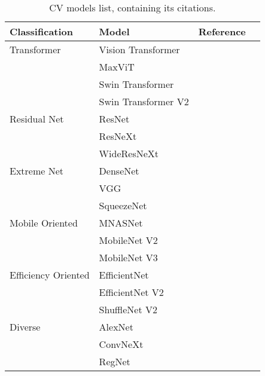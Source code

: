 
\begin{table}
	\centering
	\begin{tabular}{llcc}
		\toprule	
		Classification 		& Model 		& Reference 			\\
 		\midrule	
		Transformer    		& Vision Transformer	& \cite{VisionTransformer}	\\
			   		& MaxViT		& \cite{MaxViT}			\\
			   		& Swin Transformer	& \cite{SwinTransformer}	\\
			   		& Swin Transformer V2	& \cite{SwinTransformerV2}	\\
		Residual Net   		& ResNet		& \cite{ResNet}			\\
			 		& ResNeXt		& \cite{ResNeXt}		\\
			 		& WideResNeXt		& \cite{WideResNet}		\\
		Extreme Net	   	& DenseNet		& \cite{DenseNet}		\\
				 	& VGG			& \cite{VGG}			\\
					& SqueezeNet		& \cite{SqueezeNet}		\\
		Mobile Oriented		& MNASNet		& \cite{MNASNet}		\\
					& MobileNet V2		& \cite{MobileNetV2}		\\
					& MobileNet V3		& \cite{MobileNetV3}		\\
		Efficiency Oriented	& EfficientNet		& \cite{EfficientNet}		\\
					& EfficientNet V2	& \cite{EfficientNetV2}		\\
					& ShuffleNet V2		& \cite{ShuffleNetV2}		\\
		Diverse		  	& AlexNet		& \cite{AlexNet}		\\
					& ConvNeXt		& \cite{ConvNeXt}		\\
 					& RegNet		& \cite{RegNet}			\\
		\bottomrule
	\end{tabular}
	\caption{\acrlong{CV} models list, containing its citations.}
	\label{tab:cv_list}
\end{table}
